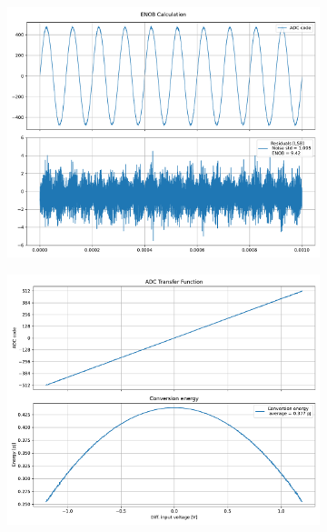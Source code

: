 \documentclass[varwidth]{standalone}
\begin{document}
\begin{figure}
\begin{subfigure}{0.32\textwidth}
    \includegraphics[width=\textwidth]{behavioral_10b_noisy_binrecomb_enob.pdf}
\end{subfigure}
\begin{subfigure}{0.32\textwidth}
    \begin{table}
    \let\center\empty
    \let\endcenter\relax
    \centering
    \resizebox{0.3\width}{!}{}
    \end{table}
    \includegraphics[width=\textwidth]{behavioral_10b_noisy_binrecomb_energy.pdf}
\end{subfigure}
\end{figure}
\end{document}
